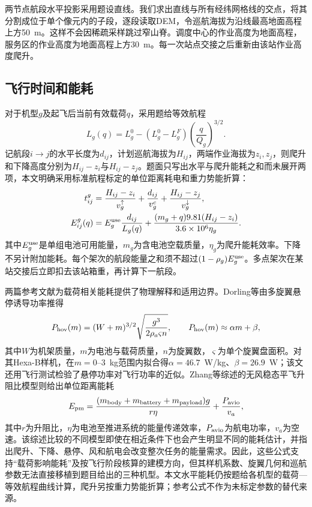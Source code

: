 两节点航段水平投影采用题设直线。我们求出直线与所有经纬网格线的交点，将其分割成位于单个像元内的子段，逐段读取DEM，令巡航海拔为沿线最高地面高程上方50~m。这样不会因稀疏采样跳过窄山脊。调度中心的作业高度为地面高程，服务区的作业高度为地面高程上方30~m。每一次站点交接之后重新由该站作业高度爬升。

\subsection{飞行时间和能耗}

对于机型$g$及起飞后当前有效载荷$q$，采用题给等效航程
\begin{equation}
L_g(q)=L_g^0-(L_g^0-L_g^F)\left(\frac{q}{Q_g}\right)^{3/2}.
\label{eq:range}
\end{equation}
记航段$i\to j$的水平长度为$d_{ij}$，计划巡航海拔为$H_{ij}$，两端作业海拔为$z_i,z_j$，则爬升和下降高度分别为$H_{ij}-z_i$与$H_{ij}-z_j$。题面只写出水平与爬升能耗之和而未展开两项，本文明确采用标准航程标定的单位距离耗电和重力势能折算：
\begin{align}
t^g_{ij}&=\frac{H_{ij}-z_i}{v_g^\uparrow}+\frac{d_{ij}}{v_g^c}+\frac{H_{ij}-z_j}{v_g^\downarrow},\\
E^g_{ij}(q)&=E_g^{\rm use}\frac{d_{ij}}{L_g(q)}+\frac{(m_g+q)9.81(H_{ij}-z_i)}{3.6\times10^6\eta_g}.
\label{eq:energy}
\end{align}
其中$E_g^{\rm use}$是单组电池可用能量，$m_g$为含电池空载质量，$\eta_g$为爬升能耗效率。下降不另计附加能耗。每个架次的航段能量之和须不超过$(1-\rho_g)E_g^{\rm use}$。多点架次在某站交接后立即扣去该站箱重，再计算下一航段。

两篇参考文献为载荷相关能耗提供了物理解释和适用边界。Dorling等由多旋翼悬停诱导功率推得
\begin{equation}
P_{\rm hov}(m)=(W+m)^{3/2}\sqrt{\frac{g^3}{2\rho_a\varsigma n}},\qquad
P_{\rm hov}(m)\approx \alpha m+\beta,
\label{eq:dorling}
\end{equation}
其中$W$为机架质量，$m$为电池与载荷质量，$n$为旋翼数，$\varsigma$为单个旋翼盘面积。对其Hexa-B样机，在$m=0$--$3$~kg范围内拟合得$\alpha=46.7$~W/kg、$\beta=26.9$~W；该文还用飞行测试检验了悬停功率对飞行功率的近似。Zhang等综述的无风稳态平飞升阻比模型则给出单位距离能耗
\begin{equation}
E_{\rm pm}=\frac{(m_{\rm body}+m_{\rm battery}+m_{\rm payload})g}{r\eta}
 +\frac{P_{\rm avio}}{v_a},
\label{eq:epm_literature}
\end{equation}
其中$r$为升阻比，$\eta$为电池至推进系统的能量传递效率，$P_{\rm avio}$为航电功率，$v_a$为空速。该综述比较的不同模型即使在相近条件下也会产生明显不同的能耗估计，并指出爬升、下降、悬停、风和航电会改变整次任务的能量需求\cite{dorling,zhang}。因此，这些公式支持“载荷影响能耗”及按飞行阶段核算的建模方向，但其样机系数、旋翼几何和巡航参数无法直接移植到题目给出的三种机型。本文水平能耗仍按题给各机型的载荷—等效航程曲线计算，爬升另按重力势能折算；参考公式不作为未标定参数的替代来源。

